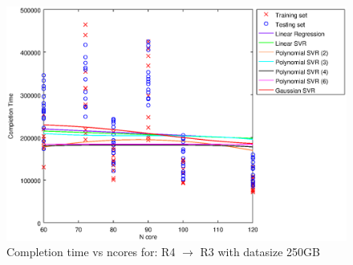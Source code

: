 
\begin {figure}[hbtp]
\centering
\includegraphics[width=\textwidth]{output/R4_R3_250_ALL_FEATURES/plot_R4_R3_250.eps}
\caption{Completion time vs ncores for: R4 $\rightarrow$ R3 with datasize 250GB}
\label{fig:coreonly_linear_R4_R3_250}
\end {figure}
